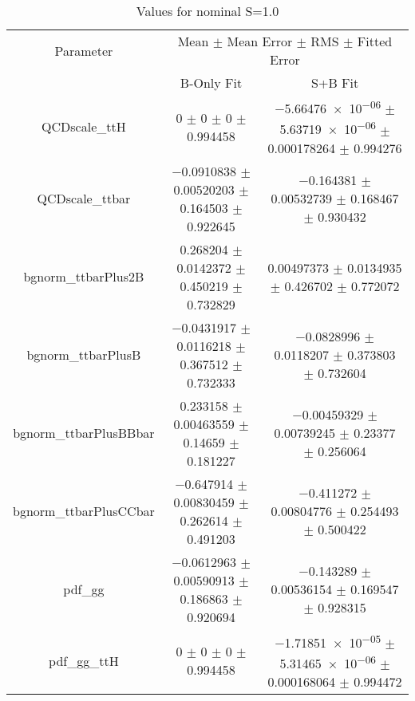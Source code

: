 \begin{table}
\centering
\caption{Values for nominal S=1.0}
\begin{tabular}{ccc}
\toprule
Parameter & \multicolumn{2}{c}{Mean $\pm$ Mean Error $\pm$ RMS $\pm$ Fitted Error}\\
 & B-Only Fit & S+B Fit\\
\midrule
QCDscale\_ttH & \num{0} $\pm$ \num{0} $\pm$ \num{0} $\pm$ \num{0.994458} & \num{-5.66476e-06} $\pm$ \num{5.63719e-06} $\pm$ \num{0.000178264} $\pm$ \num{0.994276}\\
QCDscale\_ttbar & \num{-0.0910838} $\pm$ \num{0.00520203} $\pm$ \num{0.164503} $\pm$ \num{0.922645} & \num{-0.164381} $\pm$ \num{0.00532739} $\pm$ \num{0.168467} $\pm$ \num{0.930432}\\
bgnorm\_ttbarPlus2B & \num{0.268204} $\pm$ \num{0.0142372} $\pm$ \num{0.450219} $\pm$ \num{0.732829} & \num{0.00497373} $\pm$ \num{0.0134935} $\pm$ \num{0.426702} $\pm$ \num{0.772072}\\
bgnorm\_ttbarPlusB & \num{-0.0431917} $\pm$ \num{0.0116218} $\pm$ \num{0.367512} $\pm$ \num{0.732333} & \num{-0.0828996} $\pm$ \num{0.0118207} $\pm$ \num{0.373803} $\pm$ \num{0.732604}\\
bgnorm\_ttbarPlusBBbar & \num{0.233158} $\pm$ \num{0.00463559} $\pm$ \num{0.14659} $\pm$ \num{0.181227} & \num{-0.00459329} $\pm$ \num{0.00739245} $\pm$ \num{0.23377} $\pm$ \num{0.256064}\\
bgnorm\_ttbarPlusCCbar & \num{-0.647914} $\pm$ \num{0.00830459} $\pm$ \num{0.262614} $\pm$ \num{0.491203} & \num{-0.411272} $\pm$ \num{0.00804776} $\pm$ \num{0.254493} $\pm$ \num{0.500422}\\
pdf\_gg & \num{-0.0612963} $\pm$ \num{0.00590913} $\pm$ \num{0.186863} $\pm$ \num{0.920694} & \num{-0.143289} $\pm$ \num{0.00536154} $\pm$ \num{0.169547} $\pm$ \num{0.928315}\\
pdf\_gg\_ttH & \num{0} $\pm$ \num{0} $\pm$ \num{0} $\pm$ \num{0.994458} & \num{-1.71851e-05} $\pm$ \num{5.31465e-06} $\pm$ \num{0.000168064} $\pm$ \num{0.994472}\\
\bottomrule
\end{tabular}
\end{table}